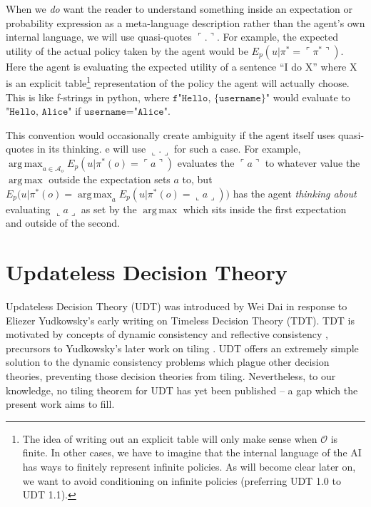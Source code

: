 \documentclass{article}
\newcommand{\qq}[1]{\ulcorner #1 \urcorner}
\DeclareMathOperator*{\argmax}{arg\,max}
\begin{document}
When we \emph{do} want the reader to understand something inside an expectation or probability expression as a meta-language description rather than the agent's own internal language, we will use quasi-quotes $\qq{.}$. For example, the expected utility of the actual policy taken by the agent would be $E_p(u|\pi^* = \qq{\pi^*})$. Here the agent is evaluating the expected utility of a sentence ``I do X'' where X is an explicit table\footnote{The idea of writing out an explicit table will only make sense when $\mathcal{O}$ is finite. In other cases, we have to imagine that the internal language of the AI has ways to finitely represent infinite policies. As will become clear later on, we want to avoid conditioning on infinite policies (preferring UDT 1.0 to UDT 1.1).} representation of the policy the agent will actually choose. This is like f-strings in python, where $\texttt{f"Hello, \{username\}"}$ would evaluate to $\texttt{"Hello, Alice"}$ if $\texttt{username="Alice"}$.

This convention would occasionally create ambiguity if the agent itself uses quasi-quotes in its thinking. e will use $\llcorner . \lrcorner$ for such a case. For example, $\argmax_{a \in \mathcal{A}_o} E_p(u|\pi^*(o)=\qq{a})$ evaluates the $\qq{a}$ to whatever value the $\argmax$ outside the expectation sets $a$ to, but $E_p \big(u|\pi^*(o)=\argmax_a E_p(u|\pi^*(o)= \llcorner a \lrcorner) \big)$ has the agent \emph{thinking about} evaluating $\llcorner a \lrcorner$ as set by the $\argmax$ which sits inside the first expectation and outside of the second.

\section{Updateless Decision Theory}

Updateless Decision Theory (UDT) was introduced by Wei Dai \cite{dai2009udt} in response to Eliezer Yudkowsky's early writing on Timeless Decision Theory (TDT). TDT is motivated by concepts of dynamic consistency and reflective consistency \cite{yudkowsky2010timeless}, precursors to Yudkowsky's later work on tiling \cite{yudkowsky2013tiling}. UDT offers an extremely simple solution to the dynamic consistency problems which plague other decision theories, preventing those decision theories from tiling. Nevertheless, to our knowledge, no tiling theorem for UDT has yet been published -- a gap which the present work aims to fill.
\end{document}
